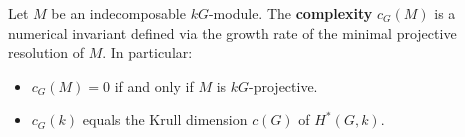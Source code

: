 \begin{definition}
\label{def:module-complexity}
Let $M$ be an indecomposable $kG$-module. The \textbf{complexity} $c_G(M)$ is a numerical invariant defined via the growth rate of the minimal projective resolution of $M$. In particular:
\begin{itemize}
\item $c_G(M) = 0$ if and only if $M$ is $kG$-projective.
\item $c_G(k)$ equals the Krull dimension $c(G)$ of $H^*(G, k)$.
\end{itemize}
\end{definition}
